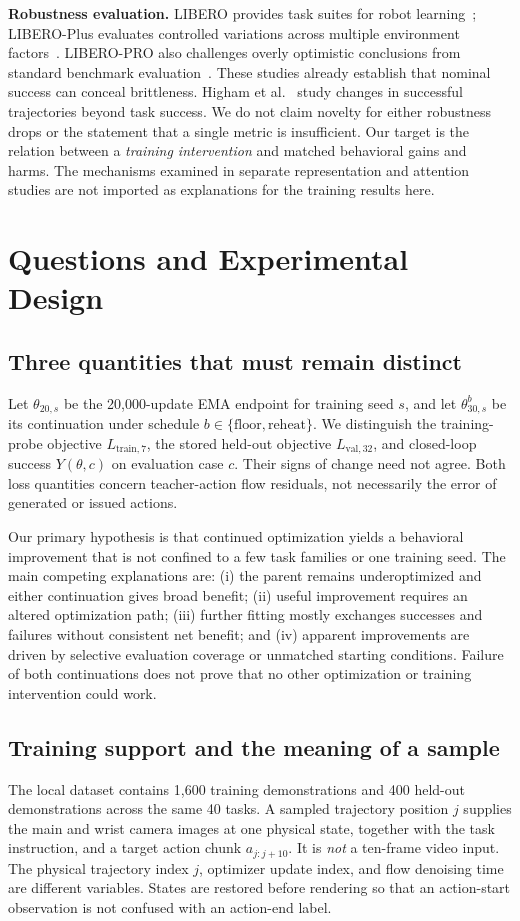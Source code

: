\documentclass[conference]{IEEEtran}
\begin{document}
\textbf{Robustness evaluation.} LIBERO provides task suites for robot learning~\cite{libero}; LIBERO-Plus evaluates controlled variations across multiple environment factors~\cite{plus}. LIBERO-PRO also challenges overly optimistic conclusions from standard benchmark evaluation~\cite{pro}. These studies already establish that nominal success can conceal brittleness. Higham et al.~\cite{behavior} study changes in successful trajectories beyond task success. We do not claim novelty for either robustness drops or the statement that a single metric is insufficient. Our target is the relation between a \emph{training intervention} and matched behavioral gains and harms. The mechanisms examined in separate representation and attention studies are not imported as explanations for the training results here.

\section{Questions and Experimental Design}
\subsection{Three quantities that must remain distinct}
Let $\theta_{20,s}$ be the 20,000-update EMA endpoint for training seed $s$, and let $\theta_{30,s}^{b}$ be its continuation under schedule $b\in\{\mathrm{floor},\mathrm{reheat}\}$. We distinguish the training-probe objective $L_{\mathrm{train},7}$, the stored held-out objective $L_{\mathrm{val},32}$, and closed-loop success $Y(\theta,c)$ on evaluation case $c$. Their signs of change need not agree. Both loss quantities concern teacher-action flow residuals, not necessarily the error of generated or issued actions.

Our primary hypothesis is that continued optimization yields a behavioral improvement that is not confined to a few task families or one training seed. The main competing explanations are: (i) the parent remains underoptimized and either continuation gives broad benefit; (ii) useful improvement requires an altered optimization path; (iii) further fitting mostly exchanges successes and failures without consistent net benefit; and (iv) apparent improvements are driven by selective evaluation coverage or unmatched starting conditions. Failure of both continuations does not prove that no other optimization or training intervention could work.

\subsection{Training support and the meaning of a sample}
The local dataset contains 1,600 training demonstrations and 400 held-out demonstrations across the same 40 tasks. A sampled trajectory position $j$ supplies the main and wrist camera images at one physical state, together with the task instruction, and a target action chunk $a_{j:j+10}$. It is \emph{not} a ten-frame video input. The physical trajectory index $j$, optimizer update index, and flow denoising time are different variables. States are restored before rendering so that an action-start observation is not confused with an action-end label.
\end{document}
